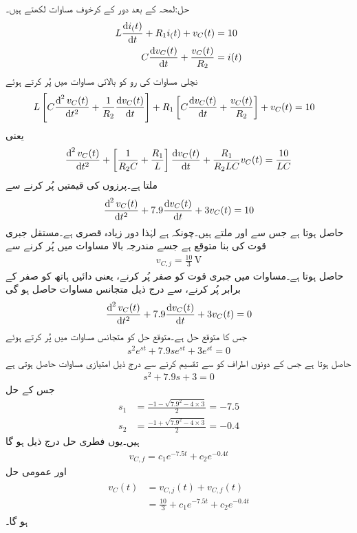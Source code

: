 حل:لمحہ  کے بعد دور کے کرخوف مساوات لکھتے ہیں۔
\begin{align*}
L\frac{\dif i_(t)}{\dif t}+R_1 i_(t)+v_C(t)&=10\\
C\frac{\dif v_C(t)}{\dif t}+\frac{v_C(t)}{R_2}&=i(t)
\end{align*}
نچلی مساوات کی رو کو بالائی مساوات  میں پُر کرتے  ہوئے
\begin{align*}
L\left[C\frac{\dif^{\,2} v_C(t)}{\dif t^2}+\frac{1}{R_2}\frac{\dif v_C(t)}{\dif t}\right]+R_1 \left[C\frac{\dif v_C(t)}{\dif t}+\frac{v_C(t)}{R_2} \right]+v_C(t)&=10
\end{align*}
یعنی
\begin{align*}
\frac{\dif^{\,2} v_C(t)}{\dif t^2}+\left[\frac{1}{R_2 C}+\frac{R_1}{L}\right]\frac{\dif v_C(t)}{\dif t}+\frac{R_1}{R_2 LC}v_C(t)=\frac{10}{LC}
\end{align*}
ملتا ہے۔پرزوں کی قیمتیں پُر کرنے سے
\begin{align}\label{مساوات_عارضی_زیادہ_قصری_مثال_الف}
\frac{\dif^{\,2} v_C(t)}{\dif t^2}+7.9 \frac{\dif v_C(t)}{\dif t}+3 v_C(t)=10
\end{align}
حاصل ہوتا ہے جس سے  اور  ملتے ہیں۔چونکہ  ہے لہٰذا دور زیادہ قصری ہے۔مستقل جبری قوت کی بنا  متوقع ہے جسے مندرجہ بالا مساوات میں پُر کرنے سے
\begin{align*}
v_{C,j}=\frac{10}{3} \, \si{\volt}
\end{align*}
حاصل ہوتا ہے۔مساوات  میں جبری قوت کو صفر پُر کرنے، یعنی دائیں ہاتھ کو صفر کے برابر پُر کرنے، سے درج ذیل متجانس مساوات حاصل ہو گی
\begin{align*}
\frac{\dif^{\,2} v_C(t)}{\dif t^2}+7.9 \frac{\dif v_C(t)}{\dif t}+3 v_C(t)=0
\end{align*}
جس کا متوقع حل  ہے۔متوقع حل کو متجانس مساوات میں پُر کرتے ہوئے
\begin{align*}
s^2 e^{st}+7.9 s e^{st}+3 e^{st}=0
\end{align*}
حاصل ہوتا ہے جس کے دونوں اطراف کو  سے تقسیم کرنے سے درج ذیل امتیازی مساوات حاصل ہوتی ہے
\begin{align*}
s^2+7.9s+3=0
\end{align*}
جس کے حل
\begin{align*}
s_1&=\frac{-1-\sqrt{7.9^2-4\times 3}}{2}=-7.5\\
s_2&=\frac{-1+\sqrt{7.9^2-4\times 3}}{2}=-0.4
\end{align*}
ہیں۔یوں فطری حل درج ذیل ہو گا
\begin{align*}
v_{C,f}=c_1 e^{-7.5t}+c_2e^{-0.4t}
\end{align*}
اور عمومی حل
\begin{gather}
\begin{aligned}\label{مساوات_عارضی_زیادہ_قصری_مثال_ب}
v_C(t)&=v_{C,j}(t)+v_{C,f}(t)\\
&=\frac{10}{3}+c_1 e^{-7.5t}+c_2e^{-0.4t}
\end{aligned}
\end{gather}
ہو گا۔

